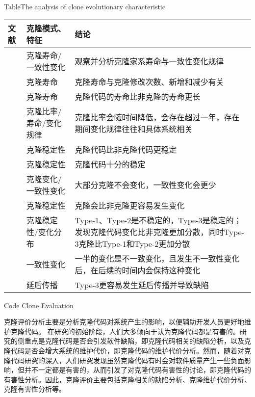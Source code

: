 \begin{table}[htbp]
\centering
{}
{Table$\!$}{The analysis of clone evolutionary characteristic}
\vspace{0.5em}
\wuhao
\begin{tabularx}{0.9\textwidth}{llX}
\toprule[1.5pt]
文献&克隆模式、特征&结论\\
\midrule[1pt]
\cite{kim2005empirical}&	克隆寿命/一致性变化	&观察并分析克隆家系寿命与一致性变化规律\\
\cite{cai2011empirical}&	克隆寿命&	克隆寿命与克隆修改次数、新增和减少有关\\
\cite{krinke2011cloned}&	克隆寿命&	克隆代码的寿命比非克隆的寿命更长\\
\cite{bazrafshan2012evolution}\cite{gode2009evolution}&	克隆比率/寿命/变化规律	&克隆比率会随时间降低，会存在超过一年，存在期间变化规律往往和具体系统相关\\
\hline
\cite{krinke2008cloned}&克隆稳定性&	克隆代码比非克隆代码更稳定\\
\cite{gode2011clone}\cite{harder2013cloned}&	克隆稳定性&	克隆代码十分的稳定\\
\cite{gode2011frequency}&	克隆变化/一致性变化&	大部分克隆不会变化，一致性变化会更少\\
\cite{rahman2014change}&	克隆稳定性&	克隆会比非克隆更容易发生变化\\
\cite{mondal2012comparative}\cite{mondal2012dispersion}&	克隆稳定性/变化分布&	Type-1、Type-2是不稳定的，Type-3是稳定的；发现克隆代码变化比非克隆更加分散，同时Type-3克隆比Type-1和Type-2更加分散\\
\hline
\cite{krinke2007study}&	一致性变化&	一半的变化是不一致变化，且发生不一致性变化后，在后续的时间内会保持这种变化\\
\cite{mondal2016comparative}&	延后传播&	Type-3更容易发生延后传播并导致缺陷\\
\bottomrule[1.5pt]
\end{tabularx}
\end{table}

{Code Clone Evaluation}

克隆评价分析主要是分析克隆代码对系统产生的影响，以便辅助开发人员更好地维护克隆代码。%
在研究的初始阶段，人们大多倾向于认为克隆代码都是有害的。研究的侧重点是克隆代码是否会引发软件缺陷，即克隆代码相关的缺陷分析，以及克隆代码是否会增大系统的维护代价，即克隆代码的维护代价分析。然而，随着对克隆代码研究的深入，人们研究发现虽然克隆代码有时会对软件质量产生一些负面影响，但并不一定都是有害的，从而引发了对克隆代码有害性的讨论，即克隆代码的有害性分析。因此，克隆评价主要包括克隆相关的缺陷分析、克隆维护代价分析、克隆有害性分析等。

